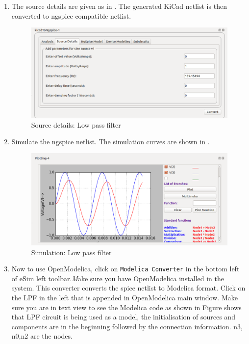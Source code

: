 \begin{enumerate}
\item The source details are given as in . The generated KiCad netlist is then converted to ngspice compatible netlist.

\begin{figure}[h]
\centering
\includegraphics[width=\lgfig]{list_of_figures/3.png}
\caption{Source details: Low pass filter}
\label{lowpass-source}
\end{figure}

\item Simulate the ngspice netlist. The simulation curves are shown in .

\begin{figure}[h]
\centering
\includegraphics[width=\lgfig]{list_of_figures/4.png}
\caption{Simulation: Low pass filter}
\label{lowpass-simulation}
\end{figure}

\item Now to use OpenModelica, click on {\tt Modelica Converter} in the bottom left of eSim left toolbar.{\textit Make sure you have OpenModelica installed in the system}. This converter converts the spice netlist to Modelica format. Click on the LPF in the left that is appended in OpenModelica main window. Make sure you are in text view to see the Modelica code as shown in  Figure shows that LPF circuit is being used as a model, the initialisation of sources and components are in the beginning followed by the connection information. n3, n0,n2 are the nodes.


\end{enumerate}
